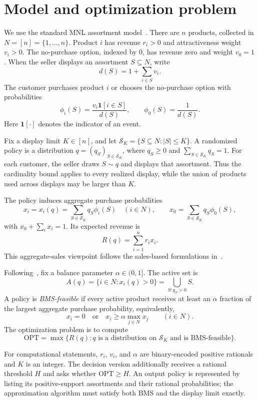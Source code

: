 \documentclass[11pt]{article}
\newcommand{\OPT}{\mathrm{OPT}}
\begin{document}
\section{Model and optimization problem}\label{sec:model}
We use the standard MNL assortment model~\cite{RusShenShmoys,TalluriVanRyzin}. There are $n$ products, collected in $N=[n]=\{1,\ldots,n\}$. Product $i$ has revenue $r_i>0$ and attractiveness weight $v_i>0$. The no-purchase option, indexed by $0$, has revenue zero and weight $v_0=1$. When the seller displays an assortment $S\subseteq N$, write
\[
 d(S)=1+\sum_{i\in S}v_i.
\]
The customer purchases product $i$ or chooses the no-purchase option with probabilities
\[
 \phi_i(S)=\frac{v_i\mathbf 1[i\in S]}{d(S)},\qquad
 \phi_0(S)=\frac1{d(S)}.
\]
Here $\mathbf 1[\cdot]$ denotes the indicator of an event.

Fix a display limit $K\in[n]$, and let $\mathcal S_K=\{S\subseteq N:|S|\le K\}$. A randomized policy is a distribution $q=(q_S)_{S\in\mathcal S_K}$, where $q_S\ge0$ and $\sum_{S\in\mathcal S_K}q_S=1$. For each customer, the seller draws $S\sim q$ and displays that assortment. Thus the cardinality bound applies to every realized display, while the union of products used across displays may be larger than $K$.

The policy induces aggregate purchase probabilities
\[
 x_i=x_i(q)=\sum_{S\in\mathcal S_K}q_S\phi_i(S)\quad(i\in N),
 \qquad
 x_0=\sum_{S\in\mathcal S_K}q_S\phi_0(S),
\]
with $x_0+\sum_i x_i=1$. Its expected revenue is
\[
 R(q)=\sum_{i=1}^n r_i x_i.
\]
This aggregate-sales viewpoint follows the sales-based formulations in~\cite{GallegoRatliffShebalov,Topaloglu}.

Following~\cite{EFTopaloglu}, fix a balance parameter $\alpha\in(0,1]$. The active set is
\[
 A(q)=\{i\in N:x_i(q)>0\}
     =\bigcup_{S:q_S>0}S.
\]
A policy is \emph{BMS-feasible} if every active product receives at least an $\alpha$ fraction of the largest aggregate purchase probability, equivalently,
\[
 x_i=0\quad\text{or}\quad
 x_i\ge \alpha\max_{j\in N}x_j
 \qquad(i\in N).
\]
The optimization problem is to compute
\[
 \OPT=\max\{R(q):q\text{ is a distribution on }\mathcal S_K
                         \text{ and is BMS-feasible}\}.
\]

For computational statements, $r_i$, $v_i$, and $\alpha$ are binary-encoded positive rationals and $K$ is an integer. The decision version additionally receives a rational threshold $H$ and asks whether $\OPT\ge H$. An output policy is represented by listing its positive-support assortments and their rational probabilities; the approximation algorithm must satisfy both BMS and the display limit exactly.
\end{document}
